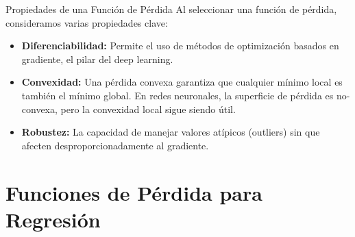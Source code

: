 \documentclass[aspectratio=169, 10pt]{beamer}
\begin{document}
\begin{frame}{Propiedades de una Función de Pérdida}
    Al seleccionar una función de pérdida, consideramos varias propiedades clave:
    \begin{itemize}
        \item<1-> \textbf{Diferenciabilidad:} Permite el uso de métodos de optimización basados en gradiente, el pilar del deep learning.
        \item<2-> \textbf{Convexidad:} Una pérdida convexa garantiza que cualquier mínimo local es también el mínimo global. En redes neuronales, la superficie de pérdida es no-convexa, pero la convexidad local sigue siendo útil.
        \item<3-> \textbf{Robustez:} La capacidad de manejar valores atípicos (outliers) sin que afecten desproporcionadamente al gradiente.
    \end{itemize}
\end{frame}

\section{Funciones de Pérdida para Regresión}
\end{document}

